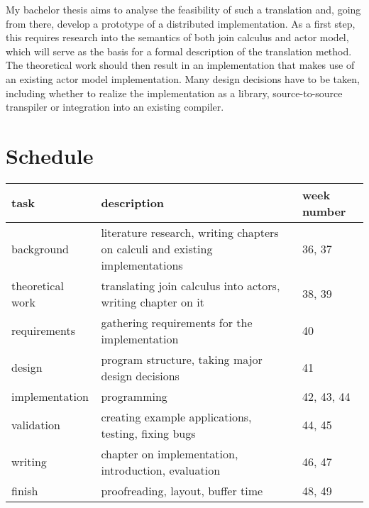 \documentclass[12pt]{article}
\begin{document}
My bachelor thesis aims to analyse the feasibility of such a translation and, going from there, develop a prototype of a distributed implementation.
As a first step, this requires research into the semantics of both join calculus and actor model, which will serve as the basis for a formal description of the translation method.
The theoretical work should then result in an implementation that makes use of an existing actor model implementation.
Many design decisions have to be taken, including whether to realize the implementation as a library, source-to-source transpiler or integration into an existing compiler.


\section*{Schedule}

\begin{tabular}{| p{3cm} | p{7cm} | p{2.45cm} |}
  \hline
    task &
    description &
    week number \\
  \hline
    background &
    literature research, writing chapters on calculi and existing implementations &
    36, 37 \\
  \hline
    theoretical work &
    translating join calculus into actors, writing chapter on it &
    38, 39 \\
  \hline
    requirements &
    gathering requirements for the implementation &
    40 \\
  \hline
    design &
    program structure, taking major design decisions &
    41 \\
  \hline
    implementation &
    programming &
    42, 43, 44 \\
  \hline
    validation &
    creating example applications, testing, fixing bugs &
    44, 45 \\
  \hline
    writing &
    chapter on implementation, introduction, evaluation &
    46, 47 \\
  \hline
    finish &
    proofreading, layout, buffer time &
    48, 49 \\
  \hline
\end{tabular}

\nocite{levy_results_1997}
\nocite{maranget_compiling_1998}

{}

\end{document}
